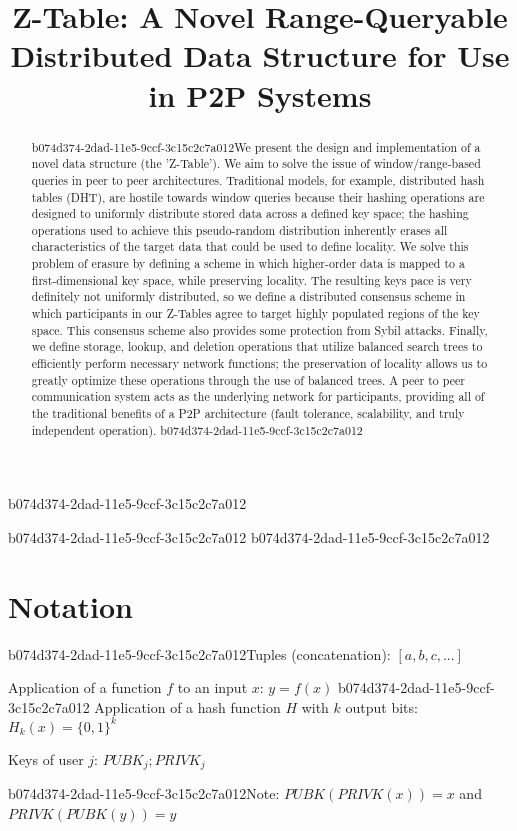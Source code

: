 \documentclass[12pt]{article}
\title{Z-Table: A Novel Range-Queryable Distributed Data Structure for Use in P2P Systems}
\begin{document}
b074d374-2dad-11e5-9ccf-3c15c2c7a012\maketitle
b074d374-2dad-11e5-9ccf-3c15c2c7a012
b074d374-2dad-11e5-9ccf-3c15c2c7a012\begin{abstract}
b074d374-2dad-11e5-9ccf-3c15c2c7a012We present the design and implementation of a novel data structure (the 'Z-Table'). We aim to solve the issue of window/range-based queries in peer to peer architectures. Traditional models, for example,  distributed hash tables (DHT), are hostile towards window queries because their hashing operations are designed to uniformly distribute stored data across a defined key space; the hashing operations used to achieve this pseudo-random distribution inherently erases all characteristics of the target data that could be used to define locality. We solve this problem of erasure by defining a scheme in which higher-order data is mapped to a first-dimensional key space, while preserving locality. The resulting keys pace is very definitely not uniformly distributed, so we define a distributed consensus scheme in which participants in our Z-Tables agree to target highly populated regions of the key space. This consensus scheme also provides some protection from Sybil attacks. Finally, we define storage, lookup, and deletion operations that utilize balanced search trees to efficiently perform necessary network functions; the preservation of locality allows us to greatly optimize these operations through the use of balanced trees. A peer to peer communication system acts as the underlying network for participants, providing all of the traditional benefits of a P2P architecture (fault tolerance, scalability, and truly independent operation).
b074d374-2dad-11e5-9ccf-3c15c2c7a012\end{abstract}

\section{Notation}

b074d374-2dad-11e5-9ccf-3c15c2c7a012Tuples (concatenation): $[a,b,c,...]$

Application of a function $f$ to an input $x$: $y=f(x)$
b074d374-2dad-11e5-9ccf-3c15c2c7a012
Application of a hash function $H$ with $k$ output bits: $H_{k}(x) = \{0,1\}^k$

Keys of user $j$: $ PUBK_j; PRIVK_j $

b074d374-2dad-11e5-9ccf-3c15c2c7a012Note: $PUBK(PRIVK(x)) = x$ and $PRIVK(PUBK(y)) = y$~
\end{document}
